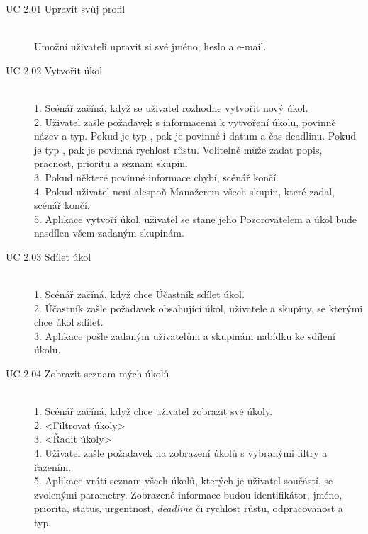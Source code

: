 \documentclass[thesis=B,czech]{FITthesis}[2012/06/26]
\begin{document}
			\begin{description}
				\item[UC 2.01 Upravit svůj profil] \hfill \\
					Umožní uživateli upravit si své jméno, heslo a e-mail.
				
				\item[UC 2.02 Vytvořit úkol] \hfill \\
					1. Scénář začíná, když se uživatel rozhodne vytvořit nový úkol. \\
					2. Uživatel zašle požadavek s informacemi k vytvoření úkolu, povinně název a typ. Pokud je typ ,  pak je povinné i datum a čas deadlinu. Pokud je typ , pak je povinná rychlost růstu. Volitelně může zadat popis, pracnost, prioritu a seznam skupin. \\
					3. Pokud některé povinné informace chybí, scénář končí. \\
					4. Pokud uživatel není alespoň Manažerem všech skupin, které zadal, scénář končí. \\
					5. Aplikace vytvoří úkol, uživatel se stane jeho Pozorovatelem a úkol bude nasdílen všem zadaným skupinám. \\
				
				\item[UC 2.03 Sdílet úkol] \hfill \\
					1. Scénář začíná, když chce Účastník sdílet úkol. \\
					2. Účastník zašle požadavek obsahující úkol, uživatele a skupiny, se kterými chce úkol sdílet. \\
					3. Aplikace pošle zadaným uživatelům a skupinám nabídku ke sdílení úkolu.
				
				\item[UC 2.04 Zobrazit seznam mých úkolů] \hfill \\
					1. Scénář začíná, když chce uživatel zobrazit své úkoly.\\
				    2. <Filtrovat úkoly> \\
				    3. <Řadit úkoly> \\
				    4. Uživatel zašle požadavek na zobrazení úkolů s vybranými filtry a řazením.\\
					5. Aplikace vrátí seznam všech úkolů, kterých je uživatel součástí, se zvolenými parametry. Zobrazené informace budou identifikátor, jméno, priorita, status, urgentnost, \textit{deadline} či rychlost růstu, odpracovanost a typ. \\
					

\end{description}
\end{document}
